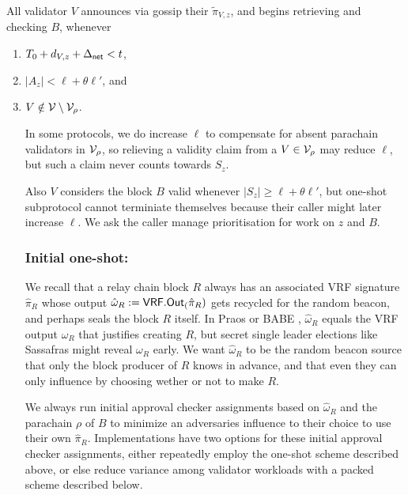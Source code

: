 All validator $V$ announces via gossip their $\tilde{\pi}_{V,z}$, and begins retrieving and checking $B$, whenever
\begin{enumerate}
\item $T_0 + d_{V,z} + \Delta_{\mathsf{net}} < t$,
\item $|A_z| < \ell + \theta \ell'$, and
\item $V \notin \mathcal{V} \setminus \mathcal{V}_\rho$.
\begin{enumerate}
In some protocols, we do increase $\ell$ to compensate for absent parachain validators in $\mathcal{V}_\rho$, so relieving a validity claim from a $V \in \mathcal{V}_\rho$ may reduce $\ell$, but such a claim never counts towards $S_z$.

Also $V$ considers the block $B$ valid whenever $|S_z| \ge \ell + \theta \ell'$, but one-shot subprotocol cannot terminiate themselves because their caller might later increase $\ell$.  We ask the caller manage prioritisation for work on $z$ and $B$.


%

\subsubsection{Initial one-shot:}

We recall that a relay chain block $R$ always has an associated VRF signature $\hat{\pi}_R$ whose output $\hat{\omega}_R := \mathsf{VRF}.\mathsf{Out}_(\hat{\pi}_R)$ gets recycled for the random beacon, and perhaps seals the block $R$ itself.  In Praos \cite{Praos} or BABE \cite{BABE}, $\hat{\omega}_R$ equals the VRF output $\omega_R$ that justifies creating $R$, but secret single leader elections like Sassafras \cite{Sassafras} might reveal $\omega_R$ early.  We want $\hat{\omega}_R$ to be the random beacon source that only the block producer of $R$ knows in advance, and that even they can only influence by choosing wether or not to make $R$.

We always run initial approval checker assignments based on $\hat{\omega}_R$ and the parachain $\rho$ of $B$ to minimize an adversaries influence to their choice to use their own $\hat{\pi}_R$.  Implementations have two options for these initial approval checker assignments, either repeatedly employ the one-shot scheme described above, or else reduce variance among validator workloads with a packed scheme described below.


\end{enumerate}
\end{enumerate}
